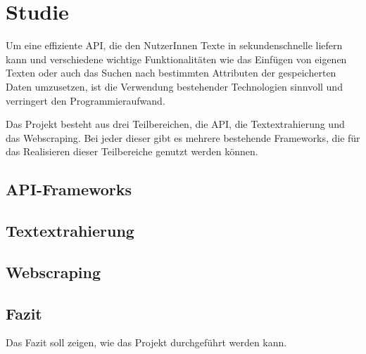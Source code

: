 \chapter{Studie}
Um eine effiziente API, die den NutzerInnen Texte in sekundenschnelle liefern kann und verschiedene wichtige Funktionalitäten wie das Einfügen von eigenen Texten oder auch das Suchen nach bestimmten Attributen der gespeicherten Daten umzusetzen, ist die Verwendung bestehender Technologien sinnvoll und verringert den Programmieraufwand.

Das Projekt besteht aus drei Teilbereichen, die API, die Textextrahierung und das Webscraping. Bei jeder dieser gibt es mehrere bestehende Frameworks, die für das Realisieren dieser Teilbereiche genutzt werden können.

\section{API-Frameworks}

\newpage


\section{Textextrahierung}
\newpage


\section{Webscraping}

\newpage


\setauthor{}
\section{Fazit}
Das Fazit soll zeigen, wie das Projekt durchgeführt werden kann.
